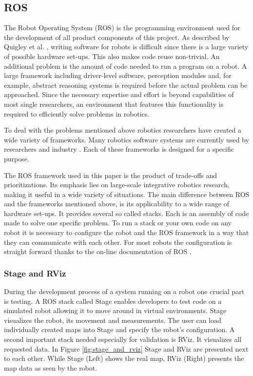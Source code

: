 \documentclass{ba-kecs}
\begin{document}
\subsection{ROS}
\label{subsec:ros}
The Robot Operating System (ROS) \cite{Quigley} is the programming environment used for the development of all product components of this project. As described by Quigley et al. \citep{Quigley}, writing software for robots is difficult since there is a large variety of possible hardware set-ups. This also makes code reuse non-trivial. An additional problem is the amount of code needed to run a program on a robot. A large framework including driver-level software, perception modules and, for example, abstract reasoning systems is required before the actual problem can be approached. Since the necessary expertise and effort is beyond capabilities of most single researchers, an environment that features this functionality is required to efficiently solve problems in robotics.

To deal with the problems mentioned above robotics researchers have created a wide variety of frameworks. Many robotics software systems are currently used by researchers and industry \cite{Kramer}. Each of these frameworks is designed for a specific purpose.

The ROS framework used in this paper is the product of trade-offs and prioritizations. Its emphasis lies on large-scale integrative robotics research, making it useful in a wide variety of situations. The main difference between ROS and the frameworks mentioned above, is its applicability to a wide range of hardware set-ups. It provides several so called stacks. Each is an assembly of code made to solve one specific problem. To run a stack or your own code on any robot it is necessary to configure the robot and the ROS framework in a way that they can communicate with each other. For most robots the configuration is straight forward thanks to the on-line documentation of ROS \citep{Roswiki}.

\subsubsection{Stage and RViz}
During the development process of a system running on a robot one crucial part is testing. A ROS stack called Stage enables developers to test code on a simulated robot allowing it to move around in virtual environments. Stage visualizes the robot, its movement and measurements. The user can load individually created maps into Stage and specify the robot's configuration. A second important stack needed especially for validation is RViz. It visualizes all requested data. In Figure \ref{fig:stage_and_rviz} Stage and RViz are presented next to each other. While Stage (Left) shows the real map, RViz (Right) presents the map data as seen by the robot.
\end{document}
